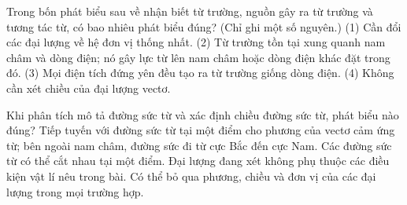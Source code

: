 \begin{ex}
Trong bốn phát biểu sau về nhận biết từ trường, nguồn gây ra từ trường và tương tác từ, có bao nhiêu phát biểu đúng? (Chỉ ghi một số nguyên.) (1) Cần đổi các đại lượng về hệ đơn vị thống nhất. (2) Từ trường tồn tại xung quanh nam châm và dòng điện; nó gây lực từ lên nam châm hoặc dòng điện khác đặt trong đó. (3) Mọi điện tích đứng yên đều tạo ra từ trường giống dòng điện. (4) Không cần xét chiều của đại lượng vectơ.
\end{ex}

\begin{ex}
Khi phân tích mô tả đường sức từ và xác định chiều đường sức từ, phát biểu nào đúng?
\choice
{\True Tiếp tuyến với đường sức từ tại một điểm cho phương của vectơ cảm ứng từ; bên ngoài nam châm, đường sức đi từ cực Bắc đến cực Nam.}
{Các đường sức từ có thể cắt nhau tại một điểm.}
{Đại lượng đang xét không phụ thuộc các điều kiện vật lí nêu trong bài.}
{Có thể bỏ qua phương, chiều và đơn vị của các đại lượng trong mọi trường hợp.}
\end{ex}

